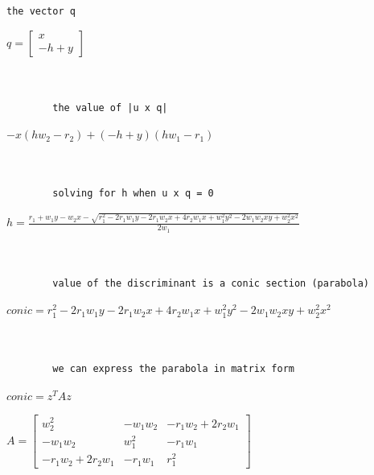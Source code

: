\documentclass[11pt]{article}
\begin{document}
            \begin{Verbatim}[commandchars=\\\{\}]
        the vector q
            \end{Verbatim}

            $\displaystyle q = \left[\begin{matrix}x\\- h + y\end{matrix}\right]$

            
            \begin{Verbatim}[commandchars=\\\{\}]


        the value of |u x q|
            \end{Verbatim}

            $\displaystyle - x \left(h w_{2} - r_{2}\right) + \left(- h + y\right) \left(h w_{1} - r_{1}\right)$

            
            \begin{Verbatim}[commandchars=\\\{\}]


        solving for h when u x q = 0
            \end{Verbatim}

            $\displaystyle h = \frac{r_{1} + w_{1} y - w_{2} x - \sqrt{r_{1}^{2} - 2 r_{1} w_{1} y - 2 r_{1} w_{2} x + 4 r_{2} w_{1} x + w_{1}^{2} y^{2} - 2 w_{1} w_{2} x y + w_{2}^{2} x^{2}}}{2 w_{1}}$

            
            \begin{Verbatim}[commandchars=\\\{\}]


        value of the discriminant is a conic section (parabola)
            \end{Verbatim}

            $\displaystyle conic = r_{1}^{2} - 2 r_{1} w_{1} y - 2 r_{1} w_{2} x + 4 r_{2} w_{1} x + w_{1}^{2} y^{2} - 2 w_{1} w_{2} x y + w_{2}^{2} x^{2}$

            
            \begin{Verbatim}[commandchars=\\\{\}]


        we can express the parabola in matrix form
            \end{Verbatim}

            $\displaystyle conic = {z^T}Az$

            
            $\displaystyle A = \left[\begin{matrix}w_{2}^{2} & - w_{1} w_{2} & - r_{1} w_{2} + 2 r_{2} w_{1}\\- w_{1} w_{2} & w_{1}^{2} & - r_{1} w_{1}\\- r_{1} w_{2} + 2 r_{2} w_{1} & - r_{1} w_{1} & r_{1}^{2}\end{matrix}\right]$
\end{document}
